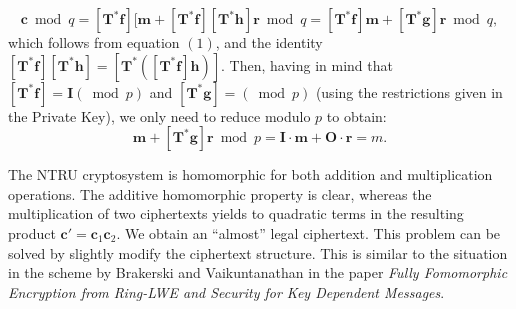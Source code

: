 \documentclass[11pt]{article}
\begin{document}
\begin{description}
\begin{equation*}
  [\boldsymbol{T^*f}]\boldsymbol{c} \bmod q = [\boldsymbol{T^*f}][\boldsymbol{m} + [\boldsymbol{T^*f}] [\boldsymbol{T^*h}]\boldsymbol{r} \bmod q = [\boldsymbol{T^*f}]\boldsymbol{m} + [\boldsymbol{T^*g}]\boldsymbol{r} \bmod q,
\end{equation*}
which follows from equation $(1)$, and the identity $[\boldsymbol{T^*f}][\boldsymbol{T^*h}] = [\boldsymbol{T^*}([\boldsymbol{T^*f}]\boldsymbol{h})]$. Then, having in mind that $[\boldsymbol{T^*f}] = \boldsymbol{I} ( \bmod p)$ and $[\boldsymbol{T^*g}] = (\bmod p)$ (using the restrictions given in the Private Key), we only need to reduce modulo $p$ to obtain:
\begin{equation*}
  [\boldsymbol{T^*f}]\boldsymbol{m} + [\boldsymbol{T^*g}]\boldsymbol{r} \bmod p = \boldsymbol{I \cdot m} + \boldsymbol{O \cdot r} = m.
\end{equation*} 
\end{description}

The NTRU cryptosystem is homomorphic for both addition and multiplication operations. The additive homomorphic property is clear, whereas the multiplication of two ciphertexts yields to quadratic terms in the resulting product $\boldsymbol{c}' = \boldsymbol{c}_1\boldsymbol{c}_2$. We obtain an ``almost'' legal ciphertext. This problem can be solved by slightly modify the ciphertext structure.
This is similar to the situation in the scheme by Brakerski and Vaikuntanathan in the paper \emph{Fully Fomomorphic Encryption from Ring-LWE and Security for Key Dependent Messages}.


\end{document}
